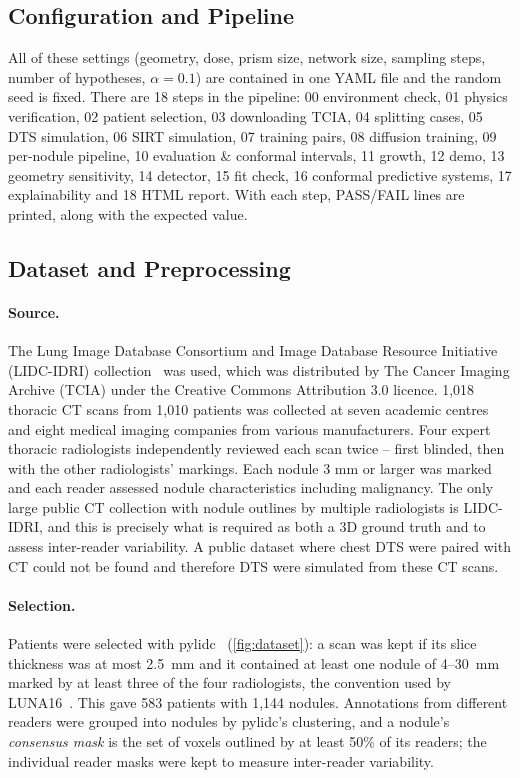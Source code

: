 \subsection{Configuration and Pipeline}
All of these settings (geometry, dose, prism size, network size, sampling steps, number of hypotheses, $\alpha=0.1$) are contained in one YAML file and the random seed is fixed. There are 18 steps in the pipeline: 00 environment check, 01 physics verification, 02 patient selection, 03 downloading TCIA, 04 splitting cases, 05 DTS simulation, 06 SIRT simulation, 07 training pairs, 08 diffusion training, 09 per-nodule pipeline, 10 evaluation \& conformal intervals, 11 growth, 12 demo, 13 geometry sensitivity, 14 detector, 15 fit check, 16 conformal predictive systems, 17 explainability and 18 HTML report. With each step, PASS/FAIL lines are printed, along with the expected value.

\subsection{Dataset and Preprocessing}

\paragraph{Source.} The Lung Image Database Consortium and Image Database Resource Initiative (LIDC-IDRI) collection~\cite{armato2011lidc} was used, which was distributed by The Cancer Imaging Archive (TCIA) under the Creative Commons Attribution 3.0 licence. 1,018 thoracic CT scans from 1,010 patients was collected at seven academic centres and eight medical imaging companies from various manufacturers. Four expert thoracic radiologists independently reviewed each scan twice -- first blinded, then with the other radiologists' markings. Each nodule 3 mm or larger was marked and each reader assessed nodule characteristics including malignancy. The only large public CT collection with nodule outlines by multiple radiologists is LIDC-IDRI, and this is precisely what is required as both a 3D ground truth and to assess inter-reader variability. A public dataset where chest DTS were paired with CT could not be found and therefore DTS were simulated from these CT scans.

\paragraph{Selection.} Patients were selected with pylidc~\cite{hancock2016pylidc} (\cref{fig:dataset}): a scan was kept if its slice thickness was at most 2.5~mm and it contained at least one nodule of 4--30~mm marked by at least three of the four radiologists, the convention used by LUNA16~\cite{setio2017luna}. This gave 583 patients with 1{,}144 nodules. Annotations from different readers were grouped into nodules by pylidc's clustering, and a nodule's \emph{consensus mask} is the set of voxels outlined by at least 50\% of its readers; the individual reader masks were kept to measure inter-reader variability.

